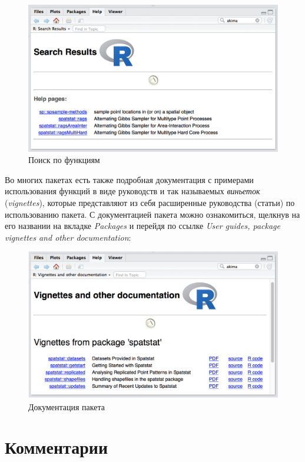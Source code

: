 \documentclass[]{book}
\begin{document}
\begin{figure}
\centering
\includegraphics{images/ch0_spsample.png}
\caption{Поиск по функциям}
\end{figure}

Во многих пакетах есть также подробная документация с примерами
использования функций в виде руководств и так называемых \emph{виньеток}
(\emph{vignettes}), которые представляют из себя расширенные руководства
(статьи) по использованию пакета. С документацией пакета можно
ознакомиться, щелкнув на его названии на вкладке \emph{Packages} и
перейдя по ссылке \emph{User guides, package vignettes and other
documentation}:

\begin{figure}
\centering
\includegraphics{images/ch0_vignette.png}
\caption{Документация пакета}
\end{figure}

\section*{Комментарии}
\end{document}
